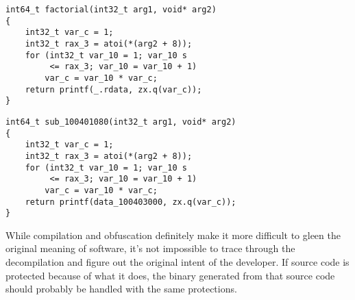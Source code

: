 \begin{minipage}{.45\textwidth}
\begin{lstlisting}[caption={Unstripped Decompilation with Binary Ninja},captionpos=b,style=CStyle,basicstyle=\scriptsize,label={lst:20210802:ninja}]
int64_t factorial(int32_t arg1, void* arg2)
{
	int32_t var_c = 1;
	int32_t rax_3 = atoi(*(arg2 + 8));
	for (int32_t var_10 = 1; var_10 s
	     <= rax_3; var_10 = var_10 + 1)
		var_c = var_10 * var_c;
	return printf(_.rdata, zx.q(var_c));
}
\end{lstlisting}
\end{minipage}
\begin{minipage}{.45\textwidth}
\begin{lstlisting}[caption={Stripped Decompilation with Binary Ninja},captionpos=b,style=CStyle,basicstyle=\scriptsize,label={lst:20210802:ninja2}]
int64_t sub_100401080(int32_t arg1, void* arg2)
{
	int32_t var_c = 1;
	int32_t rax_3 = atoi(*(arg2 + 8));
	for (int32_t var_10 = 1; var_10 s
	     <= rax_3; var_10 = var_10 + 1)
		var_c = var_10 * var_c;
	return printf(data_100403000, zx.q(var_c));
}
\end{lstlisting}
\end{minipage}

While compilation and obfuscation definitely make it more difficult to gleen the original meaning of software, it's not impossible to trace through the decompilation and figure out the original intent of the developer. If source code is protected because of what it does, the binary generated from that source code should probably be handled with the same protections.
